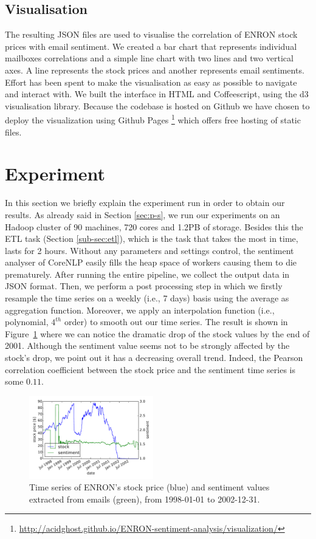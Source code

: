 \documentclass{vldb}
\begin{document}
\subsection{Visualisation}
\label{sub-sec:visualisation}
The resulting JSON files are used to visualise the correlation of ENRON stock
prices with email sentiment. We created a bar chart that represents individual
mailboxes correlations and a simple line chart with two lines and
two vertical axes. A line represents the stock prices and another represents
email sentiments. Effort has been spent to make the visualisation as easy as
possible to navigate and interact with. We built the interface in HTML and
Coffeescript, using the d3 visualisation library.
Because the codebase is hosted on Github we have chosen to deploy the visualization using Github Pages
\footnote{\url{http://acidghost.github.io/ENRON-sentiment-analysis/visualization/}}
which offers free hosting of static files.

\section{Experiment}
\label{sec:exp}
In this section we briefly explain the experiment run in order to obtain our results.
As already said in Section \ref{sec:p-s}, we run our experiments on an Hadoop
cluster of 90 machines, 720 cores and 1.2PB of storage.
Besides this the ETL task (Section \ref{sub-sec:etl}), which is the task that
takes the most in time, lasts for 2 hours. Without any parameters and settings
control, the sentiment analyser of CoreNLP easily fills the heap space of
workers causing them to die prematurely.
After running the entire pipeline, we collect the output data in JSON format.
Then, we perform a post processing step in which we firstly resample the time series on a weekly (i.e., 7 days) basis using the average as aggregation function.
Moreover, we apply an interpolation function (i.e., polynomial, $4^{th}$ order) to smooth out our time series.
The result is shown in Figure~\ref{fig:sentiment_vs_stock} where we can notice the dramatic drop of the stock values by the end of 2001.
Although the sentiment value seems not to be strongly affected by the stock's drop, we point out it has a decreasing overall trend.
Indeed, the Pearson correlation  coefficient between the stock price and the sentiment time series is some $0.11$.

\begin{figure}[h!]
\centering
\includegraphics[width=0.48\textwidth]{imgs/sentiment_vs_stock_overall.pdf}
\caption{Time series of ENRON's stock price (blue) and sentiment values extracted from emails (green), from 1998-01-01 to 2002-12-31.}
\label{fig:sentiment_vs_stock}
\end{figure}
\end{document}
